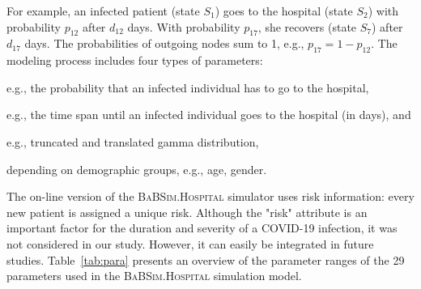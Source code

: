 \documentclass[conference]{IEEEtran}
\newcommand{\babsimhospital}{\textsc{BaBSim.Hospital}\xspace}
\renewenvironment{description}[0]{\begin{compactdesc}}{\end{compactdesc}}
\begin{document}
For example, an infected patient (state $S_1$) goes to the hospital (state $S_2$) with probability $p_{12}$ after $d_{12}$ days. With probability $p_{17}$, she recovers (state $S_7$) after $d_{17}$ days. 
The probabilities of outgoing nodes sum to 1, e.g., $p_{17} = 1 - p_{12}$.
The modeling process includes four types of parameters: 
\begin{description}
\item[transition probabilities,] e.g., the probability that an infected individual has to go to the hospital,
\item[durations,] e.g., the time span until an infected individual goes to the hospital (in days), and
\item[distribution properties,] e.g., truncated and translated gamma distribution,
\item[risk factors] depending on demographic groups, e.g., age, gender. 
\end{description}
The on-line version of the \babsimhospital simulator uses risk information: every new patient is assigned a unique risk. 
Although the "risk" attribute is an important factor for the duration and severity of a \gls{COVID-19} infection, it was not considered in our study. However, it can easily be integrated in future studies. 
Table~\ref{tab:para} presents an overview of the parameter ranges of the 29 parameters used in the \babsimhospital simulation model.
\end{document}
